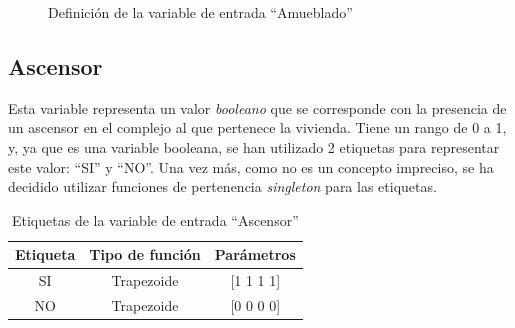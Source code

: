 \documentclass[12pt]{report} %
\begin{document}
        \begin{figure}[H]
            \centering
            \caption{Definición de la variable de entrada ``Amueblado''}
        \end{figure}

        \subsection{Ascensor}
        Esta variable representa un valor \textit{booleano} que se corresponde con la presencia de un ascensor en el complejo al que pertenece la vivienda. 
        Tiene un rango de 0 a 1, y, ya que es una variable booleana, se han utilizado 2 etiquetas para representar este valor: ``SI'' y ``NO''.
        Una vez más, como no es un concepto impreciso, se ha decidido utilizar funciones de pertenencia \textit{singleton} para las etiquetas.

        \begin{table}[h]
            \center
            \begin{tabular}{@{}ccc@{}}
                \toprule
                \textbf{Etiqueta} & \textbf{Tipo de función} & \textbf{Parámetros} \\
                \midrule
                SI & Trapezoide & [1 1 1 1] \\
                NO & Trapezoide & [0 0 0 0] \\
                \bottomrule
            \end{tabular}
            \caption{Etiquetas de la variable de entrada ``Ascensor''}
        \end{table}
\end{document}

